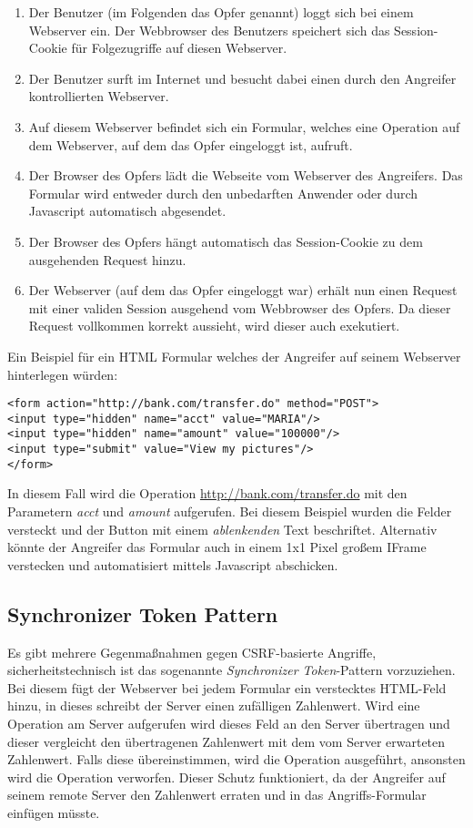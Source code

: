 \begin{enumerate}
\item Der Benutzer (im Folgenden das Opfer genannt) loggt sich bei einem Webserver ein. Der Webbrowser des Benutzers speichert sich das Session-Cookie für Folgezugriffe auf diesen Webserver.
\item Der Benutzer surft im Internet und besucht dabei einen durch den Angreifer kontrollierten Webserver.
\item Auf diesem Webserver befindet sich ein Formular, welches eine Operation auf dem Webserver, auf dem das Opfer eingeloggt ist, aufruft.
\item Der Browser des Opfers lädt die Webseite vom Webserver des Angreifers. Das Formular wird entweder durch den unbedarften Anwender oder durch Javascript automatisch abgesendet.
\item Der Browser des Opfers hängt automatisch das Session-Cookie zu dem ausgehenden Request hinzu.
\item Der Webserver (auf dem das Opfer eingeloggt war) erhält nun einen Request mit einer validen Session ausgehend vom Webbrowser des Opfers. Da dieser Request vollkommen korrekt aussieht, wird dieser auch exekutiert.
\end{enumerate}

Ein Beispiel für ein HTML Formular welches der Angreifer auf seinem Webserver hinterlegen würden:

\begin{verbatim}
<form action="http://bank.com/transfer.do" method="POST">
<input type="hidden" name="acct" value="MARIA"/>
<input type="hidden" name="amount" value="100000"/>
<input type="submit" value="View my pictures"/>
</form>
\end{verbatim}

In diesem Fall wird die Operation \url{http://bank.com/transfer.do} mit den Parametern \textit{acct} und \textit{amount} aufgerufen. Bei diesem Beispiel wurden die Felder versteckt und der Button mit einem \textit{ablenkenden} Text beschriftet. Alternativ könnte der Angreifer das Formular auch in einem 1x1 Pixel großem IFrame verstecken und automatisiert mittels Javascript abschicken.

\subsection{Synchronizer Token Pattern}

Es gibt mehrere Gegenmaßnahmen gegen CSRF-basierte Angriffe, sicherheitstechnisch ist das sogenannte \textit{Synchronizer Token}-Pattern vorzuziehen. Bei diesem fügt der Webserver bei jedem Formular ein verstecktes HTML-Feld hinzu, in dieses schreibt der Server einen zufälligen Zahlenwert. Wird eine Operation am Server aufgerufen wird dieses Feld an den Server übertragen und dieser vergleicht den übertragenen Zahlenwert mit dem vom Server erwarteten Zahlenwert. Falls diese übereinstimmen, wird die Operation ausgeführt, ansonsten wird die Operation verworfen. Dieser Schutz funktioniert, da der Angreifer auf seinem remote Server den Zahlenwert erraten und in das Angriffs-Formular einfügen müsste.

